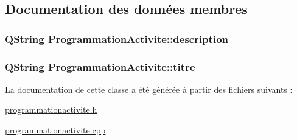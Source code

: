 \subsection{Documentation des données membres}
\hypertarget{class_programmation_activite_ae2a01c5cfffda9813ae77c1b98c7a52b}{}
\subsubsection[{description}]{\setlength{\rightskip}{0pt plus 5cm}Q\+String Programmation\+Activite\+::description\hspace{0.3cm}{\ttfamily [private]}}\label{class_programmation_activite_ae2a01c5cfffda9813ae77c1b98c7a52b}
\hypertarget{class_programmation_activite_aa6f6ff264184635b35615abb4e45ab62}{}
\subsubsection[{titre}]{\setlength{\rightskip}{0pt plus 5cm}Q\+String Programmation\+Activite\+::titre\hspace{0.3cm}{\ttfamily [private]}}\label{class_programmation_activite_aa6f6ff264184635b35615abb4e45ab62}


La documentation de cette classe a été générée à partir des fichiers suivants \+:\begin{DoxyCompactItemize}
\item 
\hyperlink{programmationactivite_8h}{programmationactivite.\+h}\item 
\hyperlink{programmationactivite_8cpp}{programmationactivite.\+cpp}\end{DoxyCompactItemize}

